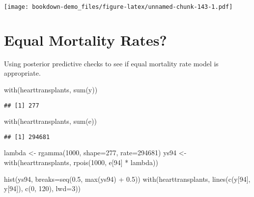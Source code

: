 \documentclass[
]{book}
\newenvironment{Shaded}{\begin{snugshade}}{\end{snugshade}}
\newcommand{\AttributeTok}[1]{\textcolor[rgb]{0.77,0.63,0.00}{#1}}
\newcommand{\DecValTok}[1]{\textcolor[rgb]{0.00,0.00,0.81}{#1}}
\newcommand{\FloatTok}[1]{\textcolor[rgb]{0.00,0.00,0.81}{#1}}
\newcommand{\FunctionTok}[1]{\textcolor[rgb]{0.00,0.00,0.00}{#1}}
\newcommand{\NormalTok}[1]{#1}
\newcommand{\OtherTok}[1]{\textcolor[rgb]{0.56,0.35,0.01}{#1}}
\newcommand{\SpecialCharTok}[1]{\textcolor[rgb]{0.00,0.00,0.00}{#1}}
\begin{document}
\texttt{[image: bookdown-demo\_files/figure-latex/unnamed-chunk-143-1.pdf]}

\hypertarget{equal-mortality-rates}{%
\section{Equal Mortality Rates?}\label{equal-mortality-rates}}

Using posterior predictive checks to see if equal mortality rate model is appropriate.

\begin{Shaded}
\begin{Highlighting}[]
\FunctionTok{with}\NormalTok{(hearttransplants, }\FunctionTok{sum}\NormalTok{(y))}
\end{Highlighting}
\end{Shaded}

\begin{verbatim}
## [1] 277
\end{verbatim}

\begin{Shaded}
\begin{Highlighting}[]
\FunctionTok{with}\NormalTok{(hearttransplants, }\FunctionTok{sum}\NormalTok{(e))}
\end{Highlighting}
\end{Shaded}

\begin{verbatim}
## [1] 294681
\end{verbatim}

\begin{Shaded}
\begin{Highlighting}[]
\NormalTok{lambda }\OtherTok{\textless{}{-}} \FunctionTok{rgamma}\NormalTok{(}\DecValTok{1000}\NormalTok{, }\AttributeTok{shape=}\DecValTok{277}\NormalTok{, }\AttributeTok{rate=}\DecValTok{294681}\NormalTok{)}
\NormalTok{ys94 }\OtherTok{\textless{}{-}} \FunctionTok{with}\NormalTok{(hearttransplants,}
      \FunctionTok{rpois}\NormalTok{(}\DecValTok{1000}\NormalTok{, e[}\DecValTok{94}\NormalTok{] }\SpecialCharTok{*}\NormalTok{ lambda))}
\end{Highlighting}
\end{Shaded}

\begin{Shaded}
\begin{Highlighting}[]
\FunctionTok{hist}\NormalTok{(ys94, }\AttributeTok{breaks=}\FunctionTok{seq}\NormalTok{(}\FloatTok{0.5}\NormalTok{, }\FunctionTok{max}\NormalTok{(ys94) }\SpecialCharTok{+} \FloatTok{0.5}\NormalTok{))}
\FunctionTok{with}\NormalTok{(hearttransplants,}
      \FunctionTok{lines}\NormalTok{(}\FunctionTok{c}\NormalTok{(y[}\DecValTok{94}\NormalTok{], y[}\DecValTok{94}\NormalTok{]), }\FunctionTok{c}\NormalTok{(}\DecValTok{0}\NormalTok{, }\DecValTok{120}\NormalTok{), }\AttributeTok{lwd=}\DecValTok{3}\NormalTok{))}
\end{Highlighting}
\end{Shaded}
\end{document}
